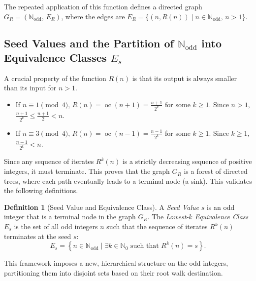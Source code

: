 \documentclass[12pt]{article}
\theoremstyle{plain}
\theoremstyle{definition}
\newtheorem{definition}[theorem]{Definition}
\begin{document}
The repeated application of this function defines a directed graph $G_R = (\mathbb{N}_{\text{odd}},\, E_R)$, where the edges are $E_R = \{ (n, R(n)) \mid n \in \mathbb{N}_{\text{odd}},\, n > 1 \}$.

\subsection{Seed Values and the Partition of $\mathbb{N}_{\text{odd}}$ into Equivalence Classes $E_s$}

A crucial property of the function $R(n)$ is that its output is always smaller than its input for $n > 1$.

\begin{itemize}
    \item If $n \equiv 1 \pmod{4}$, $R(n) = \operatorname{oc}(n+1) = \frac{n+1}{2^k}$ for some $k \geq 1$. Since $n > 1$, $\frac{n+1}{2^k} \leq \frac{n+1}{2} < n$.
    \item If $n \equiv 3 \pmod{4}$, $R(n) = \operatorname{oc}(n-1) = \frac{n-1}{2^k}$ for some $k \geq 1$. Since $k \geq 1$, $\frac{n-1}{2^k} < n$.
\end{itemize}

Since any sequence of iterates $R^k(n)$ is a strictly decreasing sequence of positive integers, it must terminate. This proves that the graph $G_R$ is a forest of directed trees, where each path eventually leads to a terminal node (a sink). This validates the following definitions.

\begin{definition}[Seed Value and Equivalence Class]
A \emph{Seed Value} $s$ is an odd integer that is a terminal node in the graph $G_R$. The \emph{Lowest-$k$ Equivalence Class} $E_s$ is the set of all odd integers $n$ such that the sequence of iterates $R^k(n)$ terminates at the seed $s$:
\[
E_s = \left\{ n \in \mathbb{N}_{\text{odd}} \mid \exists k \in \mathbb{N}_0 \text{ such that } R^k(n) = s \right\}.
\]
\end{definition}

This framework imposes a new, hierarchical structure on the odd integers, partitioning them into disjoint sets based on their root walk destination.


\newpage


\begin{thebibliography}{9}

\end{thebibliography}
\end{document}
